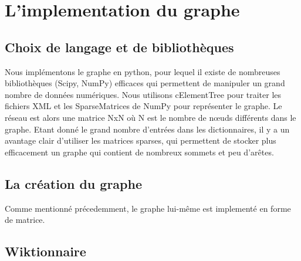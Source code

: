 \section{L'implementation du graphe}

\subsection{Choix de langage et de bibliothèques}
Nous implémentons le graphe en python, pour lequel il existe de nombreuses 
bibliothèques (Scipy, NumPy) efficaces qui permettent de manipuler un grand 
nombre de données numériques. Nous utilisons cElementTree pour traiter les 
fichiers XML et les SparseMatrices de NumPy pour représenter le graphe. Le 
réseau est alors une matrice NxN où N est le nombre de nœuds différents dans le 
graphe. Etant donné le grand nombre d'entrées dans les dictionnaires, il y a un 
avantage clair d'utiliser les matrices sparses, qui permettent de stocker plus 
efficacement un graphe qui contient de nombreux sommets et peu d'arêtes.


\subsection{La création du graphe}
Comme mentionné précedemment, le graphe lui-même est implementé en forme de 
matrice.

\subsection{Wiktionnaire}
